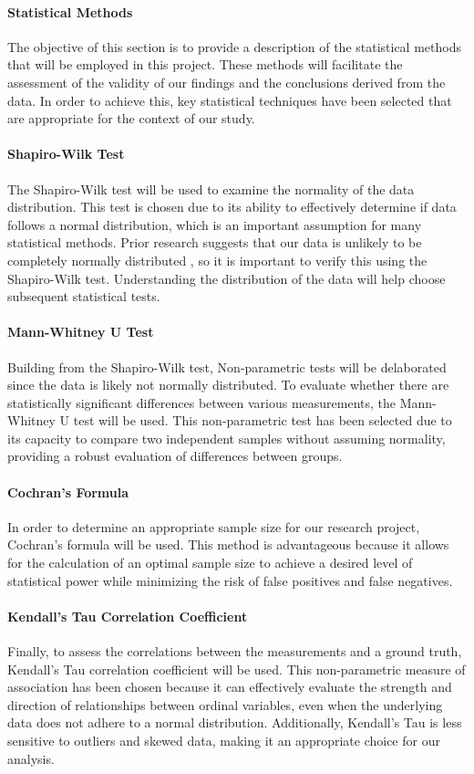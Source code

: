 \paragraph{Statistical Methods}
The objective of this section is to provide a description of the statistical methods that will be employed in this project. These methods will facilitate the assessment of the validity of our findings and the conclusions derived from the data. In order to achieve this, key statistical techniques have been selected that are appropriate for the context of our study.

\paragraph{Shapiro-Wilk Test}
The Shapiro-Wilk test will be used to examine the normality of the data distribution. This test is chosen due to its ability to effectively determine if data follows a normal distribution, which is an important assumption for many statistical methods. Prior research suggests that our data is unlikely to be completely normally distributed \cite{biksbois}, so it is important to verify this using the Shapiro-Wilk test. Understanding the distribution of the data will help choose subsequent statistical tests.

\paragraph{Mann-Whitney U Test}
Building from the Shapiro-Wilk test, Non-parametric tests will be delaborated since the data is likely not normally distributed. To evaluate whether there are statistically significant differences between various measurements, the Mann-Whitney U test will be used. This non-parametric test has been selected due to its capacity to compare two independent samples without assuming normality, providing a robust evaluation of differences between groups.

\paragraph{Cochran's Formula}
In order to determine an appropriate sample size for our research project, Cochran's formula will be used. This method is advantageous because it allows for the calculation of an optimal sample size to achieve a desired level of statistical power while minimizing the risk of false positives and false negatives.

\paragraph{Kendall's Tau Correlation Coefficient}
Finally, to assess the correlations between the measurements and a ground truth, Kendall's Tau correlation coefficient will be used. This non-parametric measure of association has been chosen because it can effectively evaluate the strength and direction of relationships between ordinal variables, even when the underlying data does not adhere to a normal distribution. Additionally, Kendall's Tau is less sensitive to outliers and skewed data, making it an appropriate choice for our analysis.


